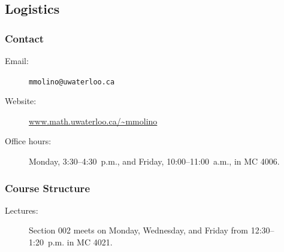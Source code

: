 
\subsection{Logistics}

\subsubsection{Contact}
\begin{description}
    \item[Email:] \texttt{mmolino@uwaterloo.ca}
    \item[Website:] \url{www.math.uwaterloo.ca/~mmolino}
    \item[Office hours:] Monday, 3:30--4:30~p.m., and Friday, 10:00--11:00~a.m., in MC 4006.
\end{description}

\subsubsection{Course Structure}
\begin{description}
    \item[Lectures:] Section 002 meets on Monday, Wednesday, and Friday from 12:30--1:20~p.m. in MC 4021.
\end{description}

